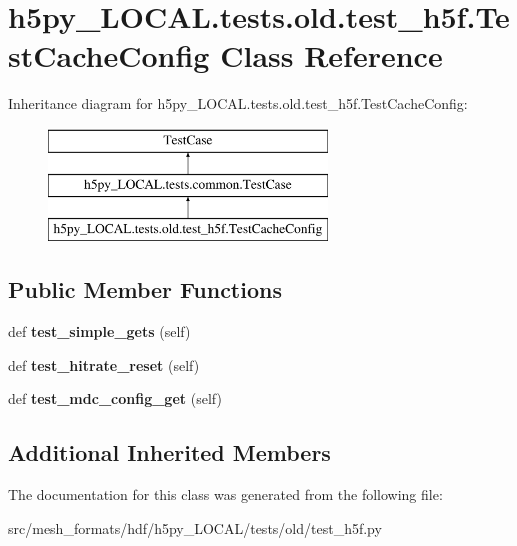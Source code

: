 \hypertarget{classh5py__LOCAL_1_1tests_1_1old_1_1test__h5f_1_1TestCacheConfig}{}\section{h5py\+\_\+\+L\+O\+C\+A\+L.\+tests.\+old.\+test\+\_\+h5f.\+Test\+Cache\+Config Class Reference}
\label{classh5py__LOCAL_1_1tests_1_1old_1_1test__h5f_1_1TestCacheConfig}
Inheritance diagram for h5py\+\_\+\+L\+O\+C\+A\+L.\+tests.\+old.\+test\+\_\+h5f.\+Test\+Cache\+Config\+:\begin{figure}[H]
\begin{center}
\leavevmode
\includegraphics[height=3.000000cm]{classh5py__LOCAL_1_1tests_1_1old_1_1test__h5f_1_1TestCacheConfig}
\end{center}
\end{figure}
\subsection*{Public Member Functions}
\begin{DoxyCompactItemize}
\item 
\mbox{\label{classh5py__LOCAL_1_1tests_1_1old_1_1test__h5f_1_1TestCacheConfig_ac2c7cb2f9119b6639037920a5660c293}} 
def {\bfseries test\+\_\+simple\+\_\+gets} (self)
\item 
\mbox{\label{classh5py__LOCAL_1_1tests_1_1old_1_1test__h5f_1_1TestCacheConfig_a4a95df1faad5ba850da1580d68b89eb3}} 
def {\bfseries test\+\_\+hitrate\+\_\+reset} (self)
\item 
\mbox{\label{classh5py__LOCAL_1_1tests_1_1old_1_1test__h5f_1_1TestCacheConfig_a58e6b45550d13fc3d37c985bdf4c465f}} 
def {\bfseries test\+\_\+mdc\+\_\+config\+\_\+get} (self)
\end{DoxyCompactItemize}
\subsection*{Additional Inherited Members}


The documentation for this class was generated from the following file\+:\begin{DoxyCompactItemize}
\item 
src/mesh\+\_\+formats/hdf/h5py\+\_\+\+L\+O\+C\+A\+L/tests/old/test\+\_\+h5f.\+py\end{DoxyCompactItemize}
